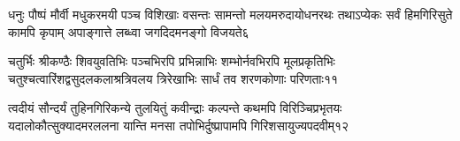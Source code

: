 %
%
%
%
%

\fourlineindentedshlokanum
{धनुः पौष्पं मौर्वी मधुकरमयी पञ्च विशिखाः}
{वसन्तः सामन्तो मलयमरुदायोधनरथः}
{तथाऽप्येकः सर्वं हिमगिरिसुते कामपि कृपाम्}
{अपाङ्गात्ते लब्ध्वा जगदिदमनङ्गो विजयते}{६}

%
%
%

\fourlineindentedshlokanum
{चतुर्भिः श्रीकण्ठैः शिवयुवतिभिः पञ्चभिरपि}
{प्रभिन्नाभिः शम्भोर्नवभिरपि मूलप्रकृतिभिः}
{चतुश्चत्वारिंशद्वसुदलकलाश्रत्रिवलय}
{त्रिरेखाभिः सार्धं तव शरणकोणाः परिणताः}{११}

\fourlineindentedshlokanum
{त्वदीयं सौन्दर्यं तुहिनगिरिकन्ये तुलयितुं}
{कवीन्द्राः कल्पन्ते कथमपि विरिञ्चिप्रभृतयः}
{यदालोकौत्सुक्यादमरललना यान्ति मनसा}
{तपोभिर्दुष्प्रापामपि गिरिशसायुज्यपदवीम्}{१२}

